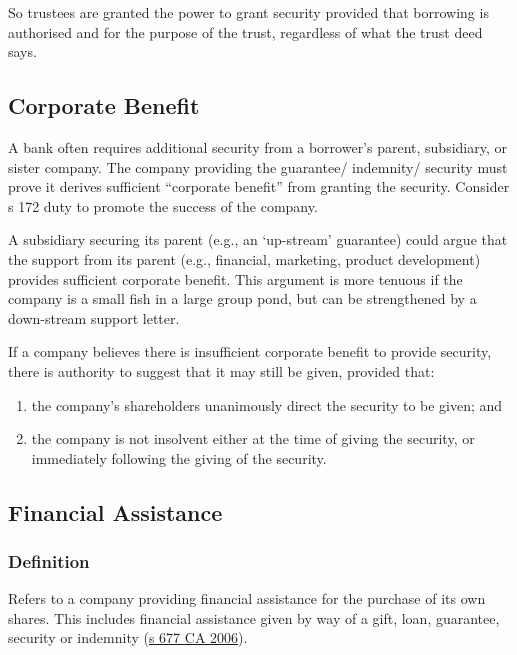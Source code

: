 \documentclass[
]{article}
\providecommand{\tightlist}{%
  \setlength{\itemsep}{0pt}\setlength{\parskip}{0pt}}
\begin{document}
So trustees are granted the power to grant security provided that
borrowing is authorised and for the purpose of the trust, regardless of
what the trust deed says.

\hypertarget{corporate-benefit}{%
\subsection{Corporate Benefit}\label{corporate-benefit}}

A bank often requires additional security from a borrower's parent,
subsidiary, or sister company. The company providing the guarantee/
indemnity/ security must prove it derives sufficient ``corporate
benefit'' from granting the security. Consider s 172 duty to promote the
success of the company.

A subsidiary securing its parent (e.g., an `up-stream' guarantee) could
argue that the support from its parent (e.g., financial, marketing,
product development) provides sufficient corporate benefit. This
argument is more tenuous if the company is a small fish in a large group
pond, but can be strengthened by a down-stream support letter.

If a company believes there is insufficient corporate benefit to provide
security, there is authority to suggest that it may still be given,
provided that:

\begin{enumerate}
\def\labelenumi{\arabic{enumi}.}
\tightlist
\item
  the company's shareholders unanimously direct the security to be
  given; and
\item
  the company is not insolvent either at the time of giving the
  security, or immediately following the giving of the security.
\end{enumerate}

\hypertarget{financial-assistance}{%
\subsection{Financial Assistance}\label{financial-assistance}}

\hypertarget{definition}{%
\subsubsection{Definition}\label{definition}}

Refers to a company providing financial assistance for the purchase of
its own shares. This includes financial assistance given by way of a
gift, loan, guarantee, security or indemnity
(\href{https://www.legislation.gov.uk/ukpga/2006/46/section/677}{s 677
CA 2006}).
\end{document}
